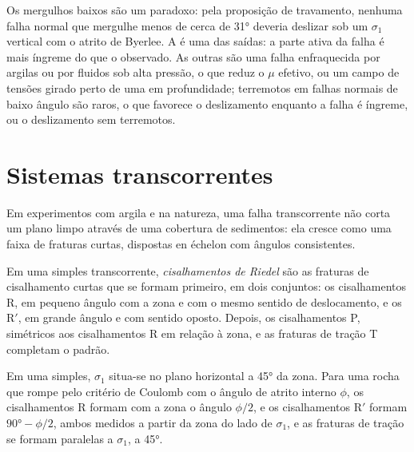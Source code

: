 Os mergulhos baixos são um paradoxo: pela proposição de travamento, nenhuma falha normal que mergulhe
menos de cerca de \ang{31} deveria deslizar sob um $\sigma_1$ vertical com
o atrito de Byerlee. A  é uma das saídas: a parte ativa da
falha é mais íngreme do que o observado. As outras são uma falha enfraquecida por argilas
ou por fluidos sob alta pressão, o que reduz o $\mu$ efetivo, ou um campo de tensões
girado perto de uma  em profundidade; terremotos em falhas normais de baixo ângulo
são raros, o que favorece o deslizamento enquanto a falha é íngreme, ou o deslizamento sem terremotos.

\section{Sistemas transcorrentes}\label{sec:b3:extension-strike-slip:strike-slip}

Em experimentos com argila e na natureza, uma falha transcorrente não corta um
plano limpo através de uma cobertura de sedimentos: ela cresce como uma faixa de fraturas curtas,
dispostas en échelon com ângulos consistentes.

\begin{definition}\label{def:b3:extension-strike-slip:riedel}
Em uma  simples transcorrente, \emph{cisalhamentos de Riedel}
são as fraturas de cisalhamento curtas que se formam primeiro, em dois conjuntos: os cisalhamentos R,
em pequeno ângulo com a zona e com o mesmo sentido de deslocamento, e os R$'$,
em grande ângulo e com sentido oposto. Depois, os cisalhamentos P, simétricos
aos cisalhamentos R em relação à zona, e as fraturas de tração T completam o padrão.
\end{definition}

\begin{proposition}\label{prop:b3:extension-strike-slip:riedel}
Em uma  simples, $\sigma_1$ situa-se no plano horizontal a
\ang{45} da zona. Para uma rocha que rompe pelo critério de Coulomb com o
ângulo de atrito interno $\phi$, os cisalhamentos R formam com a zona o ângulo $\phi/2$,
e os cisalhamentos R$'$ formam $\ang{90} - \phi/2$, ambos medidos a partir da zona
do lado de $\sigma_1$, e as fraturas de tração se formam paralelas a $\sigma_1$,
a \ang{45}.
\end{proposition}

